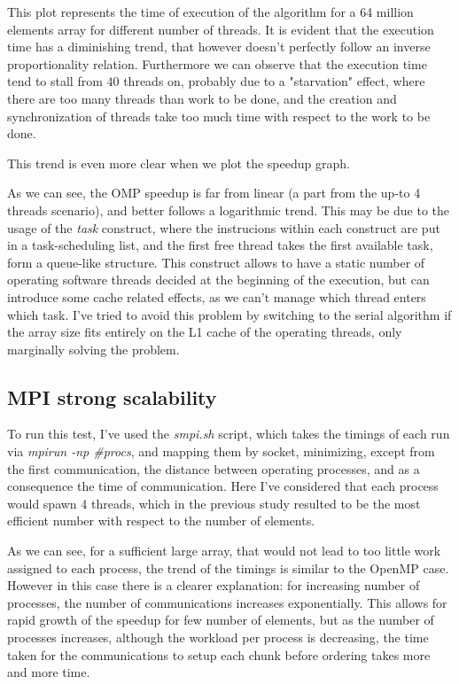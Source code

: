 \documentclass{article}
\begin{document}
	
	This plot represents the time of execution of the algorithm for a 64 million elements array for different number of threads.
	It is evident that the execution time has a diminishing trend, that however doesn't perfectly follow an inverse proportionality relation. Furthermore we can observe that the execution time tend to stall from $40$ threads on, probably due to a "starvation" effect, where there are too many threads than work to be done, and the creation and synchronization of threads take too much time with respect to the work to be done. 
	
	
	This trend is even more clear when we plot the speedup graph.
	
	
	As we can see, the OMP speedup is far from linear (a part from the up-to 4 threads scenario), and better follows a logarithmic trend. This may be due to the usage of the \textit{task} construct, where the instrucions within each construct are put in a task-scheduling list, and the first free thread takes the first available task, form a queue-like structure. This construct allows to have a static number of operating software threads decided at the beginning of the execution, but can introduce some cache related effects, as we can't manage which thread enters which task. I've tried to avoid this problem by switching to the serial algorithm if the array size fits entirely on the L1 cache of the operating threads, only marginally solving the problem.
	
	\subsection{MPI strong scalability}
	
	To run this test, I've used the \textit{smpi.sh} script, which takes the timings of each run via \textit{mpirun -np \#procs}, and mapping them by socket, minimizing, except from the first communication, the distance between operating processes, and as a consequence the time of communication. Here I've considered that each process would spawn 4 threads, which in the previous study resulted to be the most efficient number with respect to the number of elements.
	
	
	As we can see, for a sufficient large array, that would not lead to too little work assigned to each process, the trend of the timings is similar to the OpenMP case.
	However in this case there is a clearer explanation: for increasing number of processes, the number of communications increases exponentially. This allows for rapid growth of the speedup for few number of elements, but as the number of processes increases, although the workload per process is decreasing, the time taken for the communications to setup each chunk before ordering takes more and more time.
	
\end{document}
